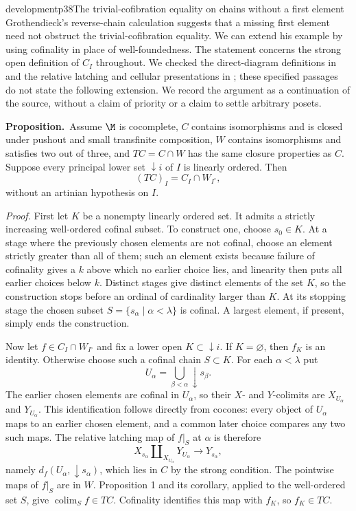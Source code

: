 \begin{dcomment}{development}{p38}{The trivial-cofibration equality on chains without a first element}
Grothendieck's reverse-chain calculation suggests that a missing first element need not obstruct the trivial-cofibration equality. We can extend his example by using cofinality in place of well-foundedness. The statement concerns the strong open definition of $C_I$ throughout. We checked the direct-diagram definitions in \citet[Sections 9.1--9.2]{RadulescuBanu2009} and the relative latching and cellular presentations in \citet[Definition 4.14 and Proposition 6.3]{RiehlVerity2014Reedy}; these specified passages do not state the following extension. We record the argument as a continuation of the source, without a claim of priority or a claim to settle arbitrary posets.

\textbf{Proposition.}\ours\ Assume $\M$ is cocomplete, $C$ contains isomorphisms and is closed under pushout and small transfinite composition, $W$ contains isomorphisms and satisfies two out of three, and $TC=C\cap W$ has the same closure properties as $C$. Suppose every principal lower set $\downarrow i$ of $I$ is linearly ordered. Then
\[
 (TC)_I=C_I\cap W_{I^\circ},
\]
without an artinian hypothesis on $I$.

\emph{Proof.} First let $K$ be a nonempty linearly ordered set. It admits a strictly increasing well-ordered cofinal subset. To construct one, choose $s_0\in K$. At a stage where the previously chosen elements are not cofinal, choose an element strictly greater than all of them; such an element exists because failure of cofinality gives a $k$ above which no earlier choice lies, and linearity then puts all earlier choices below $k$. Distinct stages give distinct elements of the set $K$, so the construction stops before an ordinal of cardinality larger than $K$. At its stopping stage the chosen subset $S=\{s_\alpha\mid\alpha<\lambda\}$ is cofinal. A largest element, if present, simply ends the construction.

Now let $f\in C_I\cap W_{I^\circ}$ and fix a lower open $K\subset\downarrow i$. If $K=\varnothing$, then $f_K$ is an identity. Otherwise choose such a cofinal chain $S\subset K$. For each $\alpha<\lambda$ put
\[
 U_\alpha=\bigcup_{\beta<\alpha}\downarrow s_\beta.
\]
The earlier chosen elements are cofinal in $U_\alpha$, so their $X$- and $Y$-colimits are $X_{U_\alpha}$ and $Y_{U_\alpha}$. This identification follows directly from cocones: every object of $U_\alpha$ maps to an earlier chosen element, and a common later choice compares any two such maps. The relative latching map of $f|_S$ at $\alpha$ is therefore
\[
 X_{s_\alpha}\amalg_{X_{U_\alpha}}Y_{U_\alpha}
       \longrightarrow Y_{s_\alpha},
\]
namely $d_f(U_\alpha,\downarrow s_\alpha)$, which lies in $C$ by the strong condition. The pointwise maps of $f|_S$ are in $W$. Proposition 1 and its corollary, applied to the well-ordered set $S$, give $\operatorname{colim}_S f\in TC$. Cofinality identifies this map with $f_K$, so $f_K\in TC$.


\end{dcomment}
